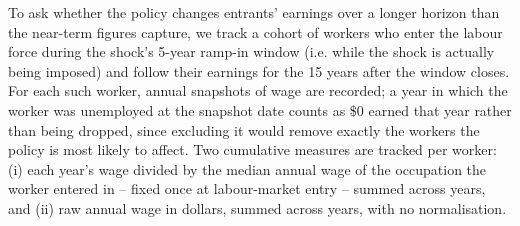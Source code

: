 \documentclass{article}
\begin{document}
To ask whether the policy changes entrants' earnings over a longer horizon than the near-term figures
capture, we track a cohort of workers who enter the labour force during the shock's 5-year ramp-in
window (i.e. while the shock is actually being imposed) and follow their earnings for the 15 years
after the window closes. For each such worker, annual snapshots of wage are recorded; a year in which
the worker was unemployed at the snapshot date counts as \$0 earned that year rather than being
dropped, since excluding it would remove exactly the workers the policy is most likely to affect. Two
cumulative measures are tracked per worker: (i) each year's wage divided by the median annual wage of
the occupation the worker entered in -- fixed once at labour-market entry -- summed across years, and
(ii) raw annual wage in dollars, summed across years, with no normalisation.

\end{document}
